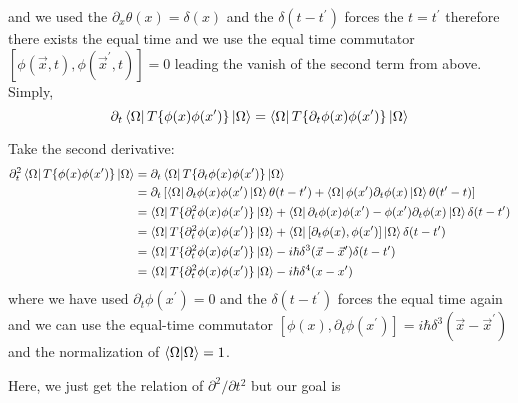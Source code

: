 \documentclass[12pt,openany]{book}
\begin{document}
	 and we used the $\partial_x\theta(x)=\delta(x)$ and the $\delta(t-t^\prime)$ forces the $t=t^\prime$ therefore there exists the equal time and we use the equal time 
	 commutator $\left[\phi(\vec{x},t),\phi(\vec{x}^\prime,t)\right]=0$ leading the vanish of the second term from above. Simply,
	 \begin{equation}
	 	\partial_t\bra{\Omega}T\{\phi(x)\phi(x^\prime)\}\ket{\Omega}=\bra{\Omega}T\{\partial_t\phi(x)\phi(x^\prime)\}\ket{\Omega}
	 \end{equation}
	 \par 
	 Take the second derivative:
	 \begin{equation}
	 	\begin{aligned}
	 		\partial_t^2\bra{\Omega}T\{\phi(x)\phi(x^\prime)\}\ket{\Omega}&=\partial_t\bra{\Omega}T\{\partial_t\phi(x)\phi(x^\prime)\}\ket{\Omega}\\
	 		                                                              &=\partial_t\left[\bra{\Omega}\partial_t\phi(x)\phi(x^\prime)\ket{\Omega}\theta(t-t^\prime)+\bra{\Omega}\phi(x^\prime)\partial_t\phi(x)\ket{\Omega}\theta(t^\prime-t)\right]\\
	 		                                                              &=\bra{\Omega}T\{\partial_t^2\phi(x)\phi(x^\prime)\}\ket{\Omega}+\bra{\Omega}\partial_t\phi(x)\phi(x^\prime)-\phi(x^\prime)\partial_t\phi(x)\ket{\Omega}\delta(t-t^\prime)\\
	 		                                                              &=\bra{\Omega}T\{\partial_t^2\phi(x)\phi(x^\prime)\}\ket{\Omega}+\bra{\Omega}\left[\partial_t\phi(x),\phi(x^\prime)\right]\ket{\Omega}\delta(t-t^\prime)\\
	 		                                                              &=\bra{\Omega}T\{\partial_t^2\phi(x)\phi(x^\prime)\}\ket{\Omega}-i\hbar\delta^3(\vec{x}-\vec{x}^\prime)\delta(t-t^\prime)\\
	 		                                                              &=\bra{\Omega}T\{\partial_t^2\phi(x)\phi(x^\prime)\}\ket{\Omega}-i\hbar\delta^4(x-x^\prime)
	 	\end{aligned}
	 \end{equation}
	 where we have used $\partial_t\phi(x^\prime)=0$ and the $\delta(t-t^\prime)$ forces the equal time again and we can use the 
	 equal-time commutator $\left[\phi(x),\partial_t\phi(x^\prime)\right]=i\hbar\delta^3(\vec{x}-\vec{x}^\prime)$
	 and the normalization of $\braket{\Omega|\Omega}=1$.
	 \par 
	 Here, we just get the relation of $\partial^2/\partial t^2$ but our goal is 
\end{document}
